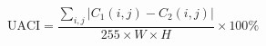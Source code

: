 \documentclass[preview,border=4pt]{standalone}
\begin{document}
\begin{equation}
\mathrm{UACI} = \frac{\sum_{i,j} \left|C_1(i,j)-C_2(i,j)\right|}{255 \times W \times H} \times 100\%
\end{equation}
\end{document}
